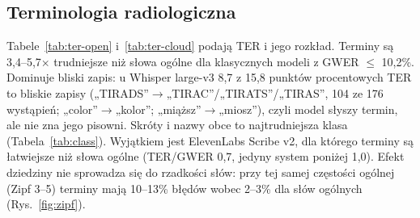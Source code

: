 \documentclass[conference]{IEEEtran}
\begin{document}
\subsection{Terminologia radiologiczna}
Tabele~\ref{tab:ter-open} i~\ref{tab:ter-cloud} podają TER i jego rozkład. Terminy są 3,4--5,7$\times$ trudniejsze niż słowa ogólne dla klasycznych modeli z GWER $\le$ 10,2\%. Dominuje bliski zapis: u Whisper large-v3 8,7 z 15,8 punktów procentowych TER to bliskie zapisy („TIRADS''$\to$„TIRAC''/„TIRATS''/„TIRAS'', 104 ze 176 wystąpień; „color''$\to$„kolor''; „miąższ''$\to$„miosz''), czyli model słyszy termin, ale nie zna jego pisowni. Skróty i nazwy obce to najtrudniejsza klasa (Tabela~\ref{tab:class}). Wyjątkiem jest ElevenLabs Scribe v2, dla którego terminy są łatwiejsze niż słowa ogólne (TER/GWER 0,7, jedyny system poniżej 1,0). Efekt dziedziny nie sprowadza się do rzadkości słów: przy tej samej częstości ogólnej (Zipf 3--5) terminy mają 10--13\% błędów wobec 2--3\% dla słów ogólnych (Rys.~\ref{fig:zipf}).
\end{document}

